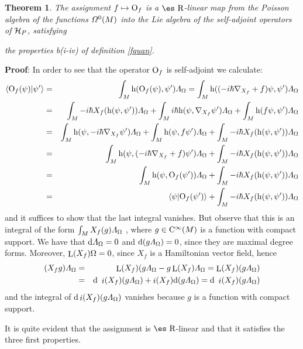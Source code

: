 \documentclass[12pt]{article}
\newtheorem{teor}{Theorem}
\def\beann{\begin{eqnarray*}}
\def\eeann{\end{eqnarray*}}
\def\dst{\(}
\def\d{{\rm d}}
\def\H{{\cal H}}
\def\Op{{\rm O}}
\def\h{{\rm h}}
\def\Real{\mbox{\es R}}
\def\inn{\mathop{i}\nolimits}
\def\Lie{\mathop{\rm L}\nolimits}
\def\Cinfty{{\rm C}^\infty}
\def\LF{{\mit\Lambda}_{\Omega}}
\begin{document}
\begin{teor}
The assignment $f \mapsto \Op_f$ is a $\Real$-linear map from
the Poisson algebra of the functions ${\mit\Omega}^0(M)$
into the Lie algebra of the self-adjoint operators of $\H_P$, satisfying

the properties
b(i-iv) of definition \ref{fquan}.
\label{prop}
\end{teor}
{\bf Proof}: 
In order to see that the operator $\Op_f$ is self-adjoint we calculate:
\beann
\langle \Op_f(\psi ) | \psi' \rangle
&=&
\int_M \h (\Op_f(\psi ),\psi') \LF
=
\int_M \h ((-i\hbar\nabla_{X_f}+f)\psi ,\psi ') \LF
\\
&=&
\int_M -i\hbar X_f(\h (\psi ,\psi ')) \LF
+ \int_M i\hbar \h (\psi ,\nabla_{X_f}\psi ') \LF
+ \int_M \h (f\psi ,\psi ') \LF
\\
&=&
\int_M \h (\psi ,-i\hbar\nabla_{X_f}\psi ') \LF
+ \int_M \h (\psi ,f\psi ') \LF
+ \int_M -i\hbar X_f( \h (\psi ,\psi ')) \LF
\\
&=&
\int_M \h (\psi ,(-i\hbar\nabla_{X_f}+f)\psi ') \LF
+ \int_M -i\hbar X_f(\h (\psi ,\psi ')) \LF
\\
&=&
\int_M \h (\psi ,\Op_f(\psi ')) \LF
+ \int_M -i\hbar X_f(\h (\psi ,\psi ')) \LF \\
&=&
\langle \psi | \Op_f(\psi ') \rangle
+ \int_M -i\hbar X_f(\h (\psi ,\psi ')) \LF
\eeann
and it suffices to show that the last integral vanishes.
But observe that  this is an integral of the form
\dst\int_M X_f(g) \LF\) , where
$g \in \Cinfty(M)$ is a function with compact support.
We have that $\d \LF = 0$ and $\d (g\LF ) = 0$,
since they are maximal degree forms.
Moreover, $\Lie(X_f)\Omega=0$, since $X_f$ is a Hamiltonian vector
field, hence
\beann
(X_fg) \LF
&=&
\Lie(X_f)(g\LF - g\Lie(X_f)\LF =\Lie(X_f)(g\LF )
\\ &=&
\d \ \inn(X_f)(g\LF )+ \inn(X_f)\d (g\LF )
=\d \ \inn(X_f)(g\LF )
\eeann
and the integral of
$\d\inn(X_f)(g\LF )$
vanishes because $g$ is a function with compact support.

It is quite evident that the assignment is $\Real$-linear and that it
satisfies the
three first properties.
\end{document}
